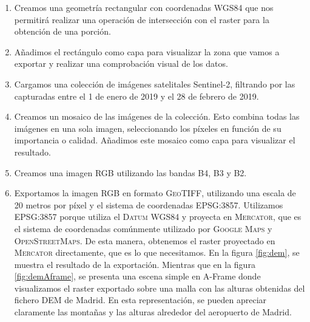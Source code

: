 \documentclass[a4paper, 11pt]{book}
\begin{document}
\begin{enumerate}
    \item Creamos una geometría rectangular con coordenadas \textsc{WGS84} que nos permitirá realizar una operación de intersección con el raster para la obtención de una porción.
    \item Añadimos el rectángulo como capa para visualizar la zona que vamos a exportar y realizar una comprobación visual de los datos.
    \item Cargamos una colección de imágenes satelitales Sentinel-2, filtrando por las capturadas entre el 1 de enero de 2019 y el 28 de febrero de 2019.
    \item Creamos un mosaico de las imágenes de la colección. Esto combina todas las imágenes en una sola imagen, seleccionando los píxeles en función de su importancia o calidad. Añadimos este mosaico como capa para visualizar el resultado.
    \item Creamos una imagen \textsc{RGB} utilizando las bandas B4, B3 y B2.
    \item Exportamos la imagen \textsc{RGB} en formato \textsc{GeoTIFF}, utilizando una escala de 20 metros por píxel y el sistema de coordenadas \textsc{EPSG:3857}. Utilizamos \textsc{EPSG:3857} porque utiliza el \textsc{Datum WGS84} y proyecta en \textsc{Mercator}, que es el sistema de coordenadas comúnmente utilizado por \textsc{Google Maps} y \textsc{OpenStreetMaps}. De esta manera, obtenemos el raster proyectado en \textsc{Mercator} directamente, que es lo que necesitamos.
    En la figura \ref{fig:dem}, se muestra el resultado de la exportación. Mientras que en la figura \ref{fig:demAframe}, se presenta una escena simple en A-Frame donde visualizamos el raster exportado sobre una malla con las alturas obtenidas del fichero DEM de Madrid. En esta representación, se pueden apreciar claramente las montañas y las alturas alrededor del aeropuerto de Madrid.
\end{enumerate}
\label{manual:generacionRaster}
\end{document}
